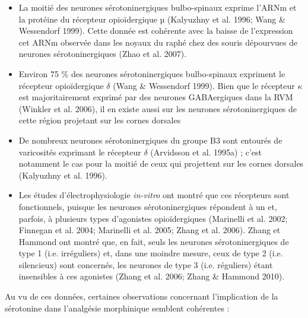 \documentclass[a4paper,12pt,twoside]{report}
\begin{document}
\begin{itemize}
\item La moitié des neurones sérotoninergiques bulbo-spinaux exprime l’ARNm et la protéine du récepteur opioïdergique µ (Kalyuzhny et al. 1996; Wang \& Wessendorf 1999). Cette donnée est cohérente avec la baisse de l’expression cet ARNm observée dans les noyaux du raphé chez des souris dépourvues de neurones sérotoninergiques (Zhao et al. 2007).
\item Environ 75 \% des neurones sérotoninergiques bulbo-spinaux expriment le récepteur opioïdergique $\delta$ (Wang \& Wessendorf 1999). 
Bien que le récepteur $\kappa$ est majoritairement exprimé par des neurones GABAergiques dans la RVM (Winkler et al. 2006), il en existe aussi sur les neurones sérotoninergiques de cette région projetant sur les cornes dorsales 
\item De nombreux neurones sérotoninergiques du groupe B3 sont entourés de varicosités exprimant le récepteur $\delta$ (Arvidsson et al. 1995a) ; c’est notamment le cas pour la moitié de ceux qui projettent sur les cornes dorsales (Kalyuzhny et al. 1996). 
\item Les études d’électrophysiologie \textit{in-vitro} ont montré que ces récepteurs sont fonctionnels, puisque les neurones sérotoninergiques répondent à un et, parfois, à plusieurs types d’agonistes opioïdergiques (Marinelli et al. 2002; Finnegan et al. 2004; Marinelli et al. 2005; Zhang et al. 2006). Zhang et Hammond ont montré que, en fait, seuls les neurones sérotoninergiques de type 1 (i.e. irréguliers) et, dans une moindre mesure, ceux de type 2 (i.e. silencieux) sont concernés, les neurones de type 3 (i.e. réguliers) étant insensibles à ces agonistes (Zhang et al. 2006; Zhang \& Hammond 2010).
\end{itemize}

Au vu de ces données, certaines observations concernant l’implication de la sérotonine dans l’analgésie morphinique semblent cohérentes :
\end{document}
